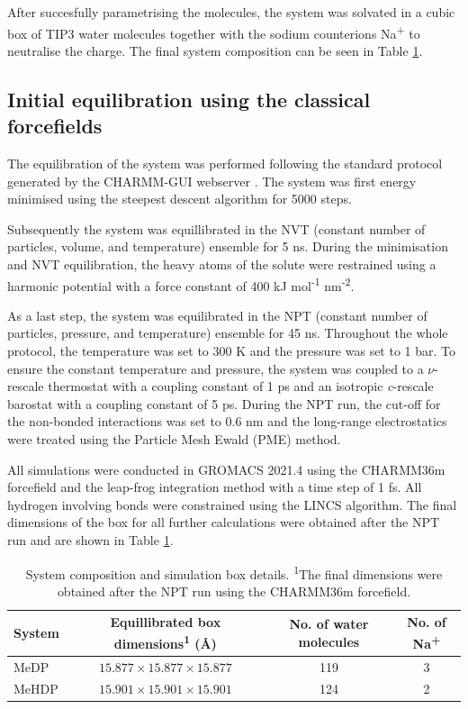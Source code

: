 After succesfully parametrising the molecules, the system was solvated in a cubic box of TIP3 water molecules together with the sodium counterions Na\textsuperscript{+} to neutralise the charge. The final system composition can be seen in Table \ref{tab:system-before-equilibration}.

\subsection{Initial equilibration using the classical forcefields}
The equilibration of the system was performed following the standard protocol generated by the CHARMM-GUI webserver \citep{jo_charmm-gui_2008}. The system was first energy minimised using the steepest descent algorithm for 5000 steps. 

Subsequently the system was equillibrated in the NVT (constant number of particles, volume, and temperature) ensemble for 5 ns. During the minimisation and NVT equilibration, the heavy atoms of the solute were restrained using a harmonic potential with a force constant of 400 kJ mol\textsuperscript{-1} nm\textsuperscript{-2}.

As a last step, the system was equilibrated in the NPT (constant number of particles, pressure, and temperature) ensemble for 45 ns. Throughout the whole protocol, the temperature was set to 300 K and the pressure was set to 1 bar. To ensure the constant temperature and pressure, the system was coupled to a $\nu$-rescale thermostat with a coupling constant of 1 ps and an isotropic \textit{c}-rescale barostat with a coupling constant of 5 ps. During the NPT run, the cut-off for the non-bonded interactions was set to 0.6 nm and the long-range electrostatics were treated using the Particle Mesh Ewald (PME) method.

All simulations were conducted in GROMACS 2021.4 \citep{abraham_gromacs_2015} using the CHARMM36m forcefield \citep{huang_charmm36m_2017} and the leap-frog integration method with a time step of 1 fs. All hydrogen involving bonds were constrained using the LINCS algorithm. The final dimensions of the box for all further calculations were obtained after the NPT run and are shown in Table \ref{tab:system-before-equilibration}.
\begin{table}[htbp]
    \centering
    \caption{System composition and simulation box details. \textsuperscript{1}The final dimensions were obtained after the NPT run using the CHARMM36m forcefield.}
    \label{tab:system-before-equilibration}
    \begin{tabular}{@{}lccc@{}}
    \toprule
    System & Equillibrated box dimensions\textsuperscript{1} (\AA) & No. of water molecules & No. of Na\textsuperscript{+} \\
    \midrule
    MeDP  & $15.877 \times 15.877 \times 15.877$ & 119 & 3 \\
    MeHDP & $15.901 \times 15.901 \times 15.901$ & 124 & 2 \\
    \bottomrule
    \end{tabular}
\end{table}



